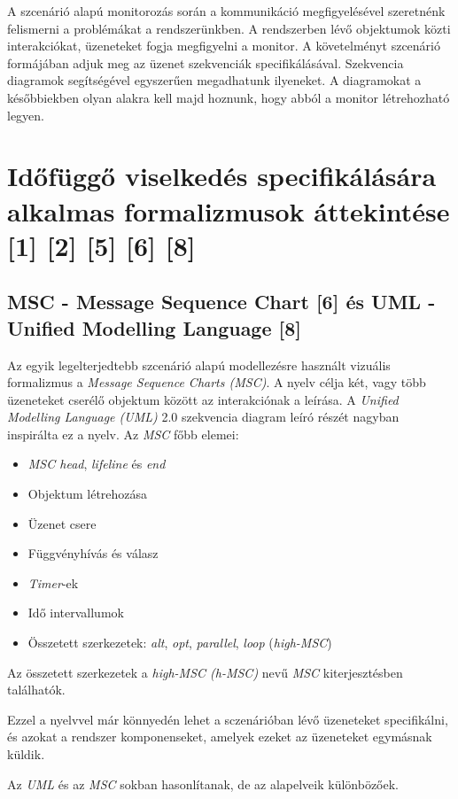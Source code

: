 A szcenárió alapú monitorozás során a kommunikáció megfigyelésével szeretnénk felismerni a problémákat a rendszerünkben.
A rendszerben lévő objektumok közti interakciókat, üzeneteket fogja megfigyelni a monitor.
A követelményt szcenárió formájában adjuk meg az üzenet szekvenciák specifikálásával.
Szekvencia diagramok segítségével egyszerűen megadhatunk ilyeneket.
A diagramokat a későbbiekben olyan alakra kell majd hoznunk, hogy abból a monitor létrehozható legyen.

\section{Időfüggő viselkedés specifikálására alkalmas formalizmusok áttekintése [1] [2] [5] [6] [8]}
\subsection{MSC - Message Sequence Chart [6] és UML - Unified Modelling Language [8]}

Az egyik legelterjedtebb szcenárió alapú modellezésre használt vizuális formalizmus a \textit{Message Sequence Charts (MSC)}.
A nyelv célja két, vagy több üzeneteket cserélő objektum között az interakciónak a leírása.
A \textit{Unified Modelling Language (UML)} 2.0 szekvencia diagram leíró részét nagyban inspirálta ez a nyelv.
Az \textit{MSC} főbb elemei:

\begin{itemize}
\item \textit{MSC head}, \textit{lifeline} és \textit{end}
\item Objektum létrehozása
\item Üzenet csere
\item Függvényhívás és válasz
\item \textit{Timer}-ek
\item Idő intervallumok
\item Összetett szerkezetek: \textit{alt}, \textit{opt}, \textit{parallel}, \textit{loop} (\textit{high-MSC})
\end{itemize}

Az összetett szerkezetek a \textit{high-MSC (h-MSC)} nevű \textit{MSC} kiterjesztésben találhatók.

Ezzel a nyelvvel már könnyedén lehet a sczenárióban lévő üzeneteket specifikálni, és azokat a rendszer komponenseket, amelyek ezeket az üzeneteket egymásnak küldik.

Az \textit{UML} és az \textit{MSC} sokban hasonlítanak, de az alapelveik különbözőek.

